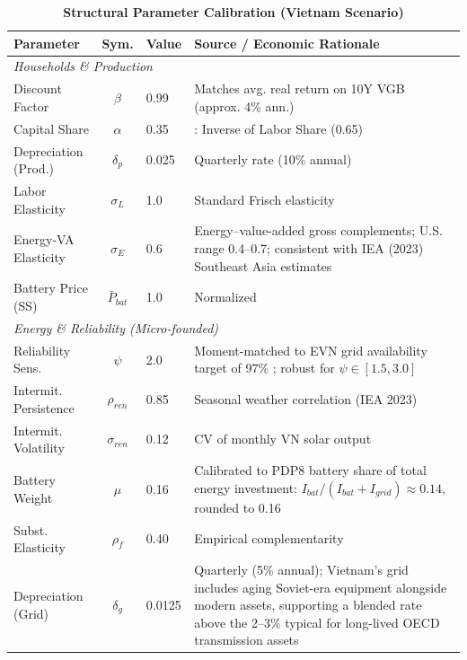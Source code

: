 \documentclass[12pt, a4paper]{article}
\begin{document}
\begin{table}[H]
    \centering
    \caption{\textbf{Structural Parameter Calibration (Vietnam Scenario)}}
    \label{tab:calibration}
    \renewcommand{\arraystretch}{1.3}
    \small
    \begin{tabular}{l c l p{6.5cm}}
        \toprule
        \textbf{Parameter} & \textbf{Sym.} & \textbf{Value} & \textbf{Source / Economic Rationale} \\
        \midrule
        \multicolumn{4}{l}{\textit{Households \& Production}} \\
        Discount Factor & $\beta$ & 0.99 & Matches avg. real return on 10Y VGB (approx. 4\% ann.) \\
        Capital Share & $\alpha$ & 0.35 & \citet{gso2024}: Inverse of Labor Share (0.65) \\
        Depreciation (Prod.) & $\delta_p$ & 0.025 & Quarterly rate (10\% annual) \\
        Labor Elasticity & $\sigma_L$ & 1.0 & Standard Frisch elasticity \\
        Energy-VA Elasticity & $\sigma_E$ & 0.6 & Energy--value-added gross complements; \citet{heutel2012} U.S. range 0.4--0.7; consistent with IEA (2023) Southeast Asia estimates \\
        Battery Price (SS) & $\bar{P}_{bat}$ & 1.0 & Normalized \\
        \midrule
        \multicolumn{4}{l}{\textit{Energy \& Reliability (Micro-founded)}} \\
        Reliability Sens. & $\psi$ & 2.0 & Moment-matched to EVN grid availability target of 97\% \citep{evn2023}; robust for $\psi \in [1.5, 3.0]$ \\
        Intermit. Persistence & $\rho_{ren}$ & 0.85 & Seasonal weather correlation (IEA 2023) \\
        Intermit. Volatility & $\sigma_{ren}$ & 0.12 & CV of monthly VN solar output \citep{gso2024,iea2023} \\
        Battery Weight & $\mu$ & 0.16 & Calibrated to PDP8 battery share of total energy investment: $I_{bat}/(I_{bat}+I_{grid}) \approx 0.14$, rounded to 0.16 \\
        Subst. Elasticity & $\rho_f$ & 0.40 & Empirical complementarity \citep{hart2019} \\
        Depreciation (Grid) & $\delta_g$ & 0.0125 & Quarterly (5\% annual); Vietnam's grid includes aging Soviet-era equipment alongside modern assets, supporting a blended rate above the 2--3\% typical for long-lived OECD transmission assets \citep{worldbank2022} \\

\end{tabular}
\end{table}
\end{document}
